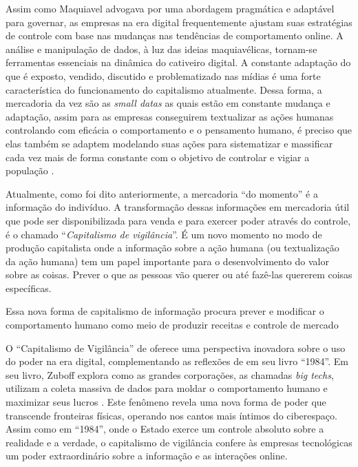 \documentclass[
	12pt,
	openright,
	twoside,
	a4paper,
	english,
	french,
	spanish,
	brazil
]{abntex2}
\begin{document}
  Assim como Maquiavel advogava por uma abordagem pragmática e adaptável para
  governar, as empresas na era digital frequentemente ajustam suas estratégias
  de controle com base nas mudanças nas tendências de comportamento online. A
  análise e manipulação de dados, à luz das ideias maquiavélicas, tornam-se
  ferramentas essenciais na dinâmica do cativeiro digital. A constante adaptação
  do que é exposto, vendido, discutido e problematizado nas mídias é uma forte
  característica do funcionamento do capitalismo atualmente. Dessa forma, a
  mercadoria da vez são as \textit{small datas} as quais estão em constante
  mudança e adaptação, assim para as empresas conseguirem textualizar as ações
  humanas controlando com eficácia o comportamento e o pensamento humano, é
  preciso que elas também se adaptem modelando suas ações para sistematizar e
  massificar cada vez mais de forma constante com o objetivo de controlar e
  vigiar a população \cite{zuboff-capitalismo-vigilancia}.

  Atualmente, como foi dito anteriormente, a mercadoria ``do momento'' é a
  informação do indivíduo. A transformação dessas informações em mercadoria
  útil que pode ser disponibilizada para venda e para exercer poder através do
  controle, é o chamado ``\textit{Capitalismo de vigilância}''. É um novo
  momento no modo de produção capitalista onde a informação sobre a ação humana
  (ou textualização da ação humana) tem um papel importante para o
  desenvolvimento do valor sobre as coisas. Prever o que as pessoas vão querer
  ou até fazê-las quererem coisas específicas.

  \begin{citacao}
    Essa nova forma de capitalismo de informação procura prever e modificar o
    comportamento humano como meio de produzir receitas e controle de mercado
    \cite{zuboff-capitalismo-vigilancia}
  \end{citacao}

  O ``Capitalismo de Vigilância'' de
   oferece uma perspectiva
  inovadora sobre o uso do poder na era digital, complementando as reflexões de
   em seu livro ``1984''. Em seu livro, Zuboff
  explora como as grandes corporações, as chamadas \textit{big techs}, utilizam
  a coleta massiva de dados para moldar o comportamento humano e maximizar seus
  lucros \cite{zuboff-capitalismo-vigilancia}. Este fenômeno revela uma nova
  forma de poder que transcende fronteiras físicas, operando nos cantos mais
  íntimos do ciberespaço. Assim como em ``1984'', onde o Estado exerce um
  controle absoluto sobre a realidade e a verdade, o capitalismo de vigilância
  confere às empresas tecnológicas um poder extraordinário sobre a informação e
  as interações online.
\end{document}
